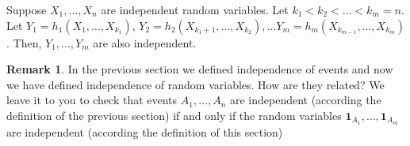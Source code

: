\documentclass[preprint,  11pt]{amsart}
\newcommand{\para}[1]{\vspace{4mm}\noindent{\bfseries #1:}}
\theoremstyle{plain} %
\theoremstyle{definition} %
\newtheorem{remark}[theorem]{Remark}
\begin{document}
\para{Fact} Suppose $X_{1},\ldots ,X_{n}$ are independent random variables. Let $k_{1}<k_{2}<\ldots <k_{m}=n$. Let $Y_{1}=h_{1}(X_{1},\ldots ,X_{k_{1}})$, $Y_{2}=h_{2}(X_{k_{1}+{1}},\ldots ,X_{k_{2}}), \ldots Y_{m}=h_{m}(X_{k_{m-1}},\ldots ,X_{k_{m}})$. Then, $Y_{1},\ldots ,Y_{m}$ are also independent.


\begin{remark} In the previous section we defined independence of events and now we have defined independence of random variables. How are they related? We leave it to you to check that events $A_{1},\ldots ,A_{n}$ are independent (according the definition of the previous section) if and only if the random variables ${\mathbf 1}_{A_{1}},\ldots ,{\mathbf 1}_{A_{m}}$ are independent (according the definition of this section)
\end{remark}
\end{document}
